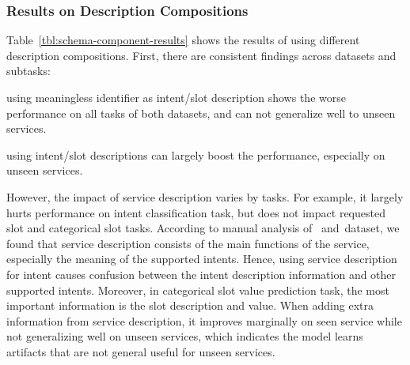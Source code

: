 \subsubsection{Results on Description Compositions}
\label{sssec:com-results}
Table~\ref{tbl:schema-component-results} shows the results of using
different description compositions. First, there are consistent
findings across datasets and subtasks:
\begin{inparaenum}[(1)]
 \item using meaningless identifier as intent/slot description shows
  the worse performance on all tasks of both datasets, and can
  not generalize well to unseen services.
 \item using intent/slot descriptions can largely boost the performance,
  especially on unseen services.
\end{inparaenum}

However, the impact of service description varies by tasks. For
example, it largely hurts performance on intent classification task,
but does not impact %
requested slot and categorical slot tasks. According to manual
analysis of \sgdst~and~\multiwoz dataset, we found that service
description consists of the main functions of the service, especially
the meaning of the supported intents. Hence, using service description
for intent causes confusion between the intent description information
and other supported intents. Moreover, in categorical slot value
prediction task, the most important information is the slot
description and value.  When adding extra information from service
description, it improves marginally on seen service while not
generalizing well on unseen services, which indicates the model learns
artifacts that are not general useful for unseen services.

